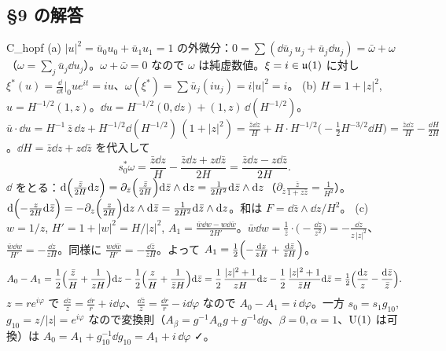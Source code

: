 \subsection*{§9 の解答}
\begin{soll}{C_hopf}
(a) $|u|^2=\bar u_0u_0+\bar u_1u_1=1$ の外微分：$0=\sum(\dd\bar u_j\,u_j+\bar u_j\dd u_j)=\bar\omega+\omega$（$\omega=\sum_j\bar u_j\dd u_j$）。$\omega+\bar\omega=0$ なので $\omega$ は純虚数値。$\xi=i\in\mathfrak{u}(1)$ に対し $\xi^*(u)=\frac{\dd}{\dd t}|_0ue^{it}=iu$、$\omega(\xi^*)=\sum\bar u_j(iu_j)=i|u|^2=i$。
(b) $H=1+|z|^2$, $u=H^{-1/2}(1,z)$。$\dd u=H^{-1/2}(0,\dd z)+(1,z)\,\dd(H^{-1/2})$。$\bar u\cdot\dd u=H^{-1}\,\bar z\,\dd z+H^{-1/2}\dd(H^{-1/2})\,(1+|z|^2)=\frac{\bar z\dd z}H+H\cdot H^{-1/2}\bigl(-\tfrac12H^{-3/2}\dd H\bigr)=\frac{\bar z\dd z}H-\frac{\dd H}{2H}$。$\dd H=\bar z\dd z+z\dd\bar z$ を代入して
\[
s_0^*\omega=\frac{\bar z\dd z}H-\frac{\bar z\dd z+z\dd\bar z}{2H}=\frac{\bar z\dd z-z\dd\bar z}{2H}.
\]
$\dd$ をとる：$\mathrm{d}\Bigl(\frac{\bar z}{2H}\mathrm{d} z\Bigr)=\partial_{\bar z}\Bigl(\frac{\bar z}{2H}\Bigr)\mathrm{d}\bar z\wedge\mathrm{d} z=\frac1{2H^2}\mathrm{d}\bar z\wedge\mathrm{d} z$（$\partial_{\bar z}\frac{\bar z}{1+z\bar z}=\frac1{H^2}$）。$\mathrm{d}\Bigl(-\frac z{2H}\mathrm{d}\bar z\Bigr)=-\partial_z\Bigl(\frac z{2H}\Bigr)\mathrm{d} z\wedge\mathrm{d}\bar z=\frac1{2H^2}\mathrm{d}\bar z\wedge\mathrm{d} z$。和は $F=\dd\bar z\wedge\dd z/H^2$。
(c) $w=1/z$, $H'=1+|w|^2=H/|z|^2$, $A_1=\frac{\bar w\dd w-w\dd\bar w}{2H'}$。$\bar w\dd w=\frac1{\bar z}\cdot\bigl(-\frac{\dd z}{z^2}\bigr)=-\frac{\dd z}{z\,|z|^2}$、$\frac{\bar w\dd w}{H'}=-\frac{\dd z}{zH}$。同様に $\frac{w\dd\bar w}{H'}=-\frac{\dd\bar z}{\bar zH}$。よって $A_1=\frac12\Bigl(-\frac{\mathrm{d} z}{zH}+\frac{\mathrm{d}\bar z}{\bar zH}\Bigr)$。
\[
A_0-A_1=\frac12\Bigl(\frac{\bar z}H+\frac1{zH}\Bigr)\mathrm{d} z-\frac12\Bigl(\frac zH+\frac1{\bar zH}\Bigr)\mathrm{d}\bar z=\frac12\,\frac{|z|^2+1}{zH}\mathrm{d} z-\frac12\,\frac{|z|^2+1}{\bar zH}\mathrm{d}\bar z=\tfrac12\Bigl(\frac{\mathrm{d} z}z-\frac{\mathrm{d}\bar z}{\bar z}\Bigr).
\]
$z=re^{i\varphi}$ で $\frac{\dd z}z=\frac{\dd r}r+i\dd\varphi$、$\frac{\dd\bar z}{\bar z}=\frac{\dd r}r-i\dd\varphi$ なので $A_0-A_1=i\,\dd\varphi$。一方 $s_0=s_1g_{10}$, $g_{10}=z/|z|=e^{i\varphi}$ なので変換則（$A_\beta=g^{-1}A_\alpha g+g^{-1}\dd g$、$\beta=0,\alpha=1$、$\mathrm{U}(1)$ は可換）は $A_0=A_1+g_{10}^{-1}\dd g_{10}=A_1+i\,\dd\varphi$ ✓。
\end{soll}


